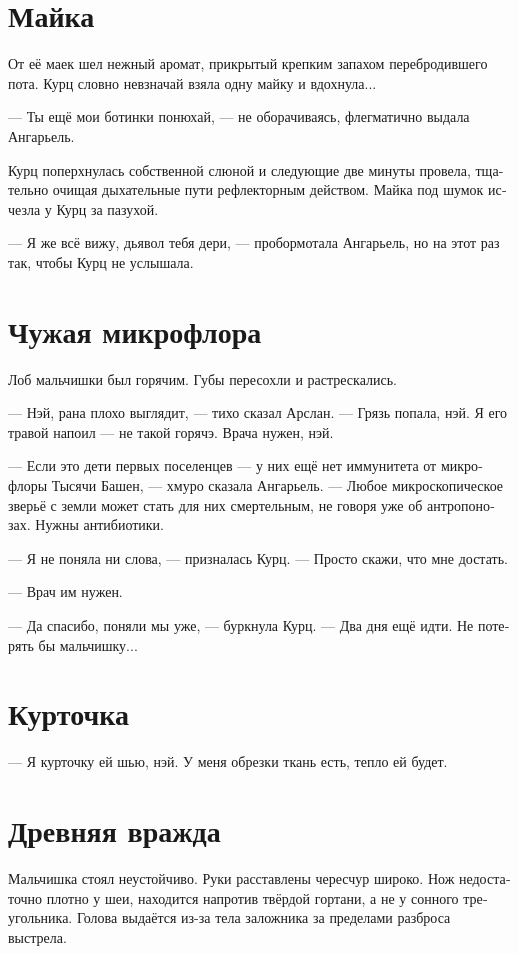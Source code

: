 \documentclass[a4paper,12pt,fleqn]{book}\usepackage{cooltooltips}\usepackage{polyglossia}\setdefaultlanguage[babelshorthands=true]{russian}\setotherlanguage{english}\defaultfontfeatures{Ligatures=TeX,Mapping=tex-text} \usepackage{xcolor}\definecolor{lightgray}{HTML}{bbbbbb}\color{lightgray}\newcommand{\ml}[3]{\textenglish{\textcolor{black}{#3}}}
\begin{document}
\section{Майка}

От её маек шел нежный аромат, прикрытый крепким запахом перебродившего пота.
Курц словно невзначай взяла одну майку и вдохнула...

--- Ты ещё мои ботинки понюхай, --- не оборачиваясь, флегматично выдала Ангарьель.

Курц поперхнулась собственной слюной и следующие две минуты провела, тщательно очищая дыхательные пути рефлекторным действом.
Майка под шумок исчезла у Курц за пазухой.

--- Я же всё вижу, дьявол тебя дери, --- пробормотала Ангарьель, но на этот раз так, чтобы Курц не услышала.

\section{Чужая микрофлора}

Лоб мальчишки был горячим.
Губы пересохли и растрескались.

--- Нэй, рана плохо выглядит, --- тихо сказал Арслан.
--- Грязь попала, нэй.
Я его травой напоил --- не такой горячэ.
Врача нужен, нэй.

--- Если это дети первых поселенцев --- у них ещё нет иммунитета от микрофлоры Тысячи Башен, --- хмуро сказала Ангарьель.
--- Любое микроскопическое зверьё с земли может стать для них смертельным, не говоря уже об антропонозах.
Нужны антибиотики.

--- Я не поняла ни слова, --- призналась Курц.
--- Просто скажи, что мне достать.

--- Врач им нужен.

--- Да спасибо, поняли мы уже, --- буркнула Курц.
--- Два дня ещё идти.
Не потерять бы мальчишку...

\section{Курточка}

--- Я курточку ей шью, нэй.
У меня обрезки ткань есть, тепло ей будет.

\section{Древняя вражда}

Мальчишка стоял неустойчиво.
Руки расставлены чересчур широко.
Нож недостаточно плотно у шеи, находится напротив твёрдой гортани, а не у сонного треугольника.
Голова выдаётся из-за тела заложника за пределами разброса выстрела.
\end{document}

